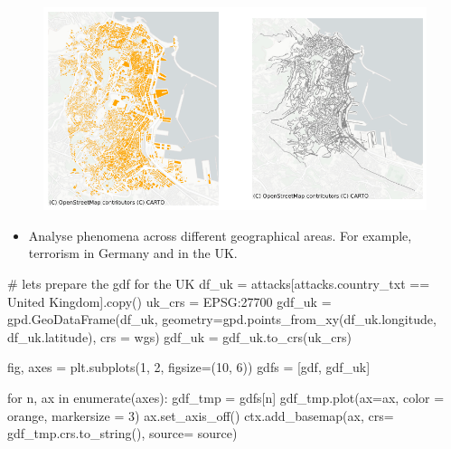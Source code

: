 \documentclass[
  letterpaper,
  DIV=11,
  numbers=noendperiod]{scrreprt}
\newenvironment{Shaded}{\begin{snugshade}}{\end{snugshade}}
\newcommand{\BuiltInTok}[1]{\textcolor[rgb]{0.00,0.23,0.31}{#1}}
\newcommand{\CommentTok}[1]{\textcolor[rgb]{0.37,0.37,0.37}{#1}}
\newcommand{\ControlFlowTok}[1]{\textcolor[rgb]{0.00,0.23,0.31}{#1}}
\newcommand{\DecValTok}[1]{\textcolor[rgb]{0.68,0.00,0.00}{#1}}
\newcommand{\KeywordTok}[1]{\textcolor[rgb]{0.00,0.23,0.31}{#1}}
\newcommand{\NormalTok}[1]{\textcolor[rgb]{0.00,0.23,0.31}{#1}}
\newcommand{\OperatorTok}[1]{\textcolor[rgb]{0.37,0.37,0.37}{#1}}
\newcommand{\StringTok}[1]{\textcolor[rgb]{0.13,0.47,0.30}{#1}}
\providecommand{\tightlist}{%
  \setlength{\itemsep}{0pt}\setlength{\parskip}{0pt}}\usepackage{longtable,booktabs,array}
\begin{document}
\begin{figure}[H]

{\centering \includegraphics{labs/w02_maps_files/figure-pdf/cell-21-output-1.png}

}

\end{figure}

\begin{itemize}
\tightlist
\item
  Analyse phenomena across different geographical areas. For example,
  terrorism in Germany and in the UK.
\end{itemize}

\begin{Shaded}
\begin{Highlighting}[]
\CommentTok{\# let\textquotesingle{}s prepare the gdf for the UK}
\NormalTok{df\_uk }\OperatorTok{=}\NormalTok{ attacks[attacks.country\_txt }\OperatorTok{==} \StringTok{\textquotesingle{}United Kingdom\textquotesingle{}}\NormalTok{].copy()}
\NormalTok{uk\_crs }\OperatorTok{=} \StringTok{\textquotesingle{}EPSG:27700\textquotesingle{}}
\NormalTok{gdf\_uk }\OperatorTok{=}\NormalTok{ gpd.GeoDataFrame(df\_uk, geometry}\OperatorTok{=}\NormalTok{gpd.points\_from\_xy(df\_uk.longitude, df\_uk.latitude), crs }\OperatorTok{=}\NormalTok{ wgs)}
\NormalTok{gdf\_uk }\OperatorTok{=}\NormalTok{ gdf\_uk.to\_crs(uk\_crs)}
\end{Highlighting}
\end{Shaded}

\begin{Shaded}
\begin{Highlighting}[]
\NormalTok{fig, axes }\OperatorTok{=}\NormalTok{ plt.subplots(}\DecValTok{1}\NormalTok{, }\DecValTok{2}\NormalTok{, figsize}\OperatorTok{=}\NormalTok{(}\DecValTok{10}\NormalTok{, }\DecValTok{6}\NormalTok{))}
\NormalTok{gdfs }\OperatorTok{=}\NormalTok{ [gdf, gdf\_uk]}

\ControlFlowTok{for}\NormalTok{ n, ax }\KeywordTok{in} \BuiltInTok{enumerate}\NormalTok{(axes):}
\NormalTok{    gdf\_tmp }\OperatorTok{=}\NormalTok{ gdfs[n]}
\NormalTok{    gdf\_tmp.plot(ax}\OperatorTok{=}\NormalTok{ax, color }\OperatorTok{=} \StringTok{\textquotesingle{}orange\textquotesingle{}}\NormalTok{, markersize }\OperatorTok{=} \DecValTok{3}\NormalTok{)}
\NormalTok{    ax.set\_axis\_off()}
\NormalTok{    ctx.add\_basemap(ax, crs}\OperatorTok{=}\NormalTok{ gdf\_tmp.crs.to\_string(), source}\OperatorTok{=}\NormalTok{ source)}
\end{Highlighting}
\end{Shaded}
\end{document}

